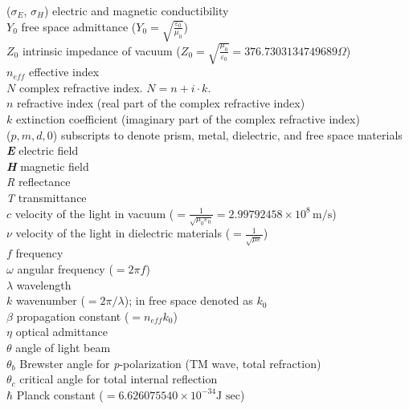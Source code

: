 \begin{tabbing}
  ($\sigma_{E}$, $\sigma_{H}$) \> electric and magnetic conductibility \\
  $Y_0$ \> free space admittance ($Y_0=\sqrt{\frac{\displaystyle \varepsilon_0}{\displaystyle \mu_0}}$) \\
  $Z_0$ \> intrinsic impedance of vacuum ($Z_0=\sqrt{\frac{\displaystyle \mu_0}{\displaystyle \varepsilon_0}}
           =376.7303134749689\Omega$) \\
  $n_{eff}$ \> effective index \\
  $N$ \> complex refractive index. $N = n + i \cdot k$. \\
  $n$ \> refractive index (real part of the complex refractive index) \\
  $k$ \> extinction coefficient (imaginary part of the complex refractive index)\\
  ($p, m, d, 0$) \> subscripts to denote prism, metal, dielectric, and free space materials \\
  \emph{\textbf{E}} \> electric field \\
  \emph{\textbf{H}} \> magnetic field \\
  \emph{R} \> reflectance \\
  \emph{T} \> transmittance \\
  $c$ \> velocity of the light in vacuum ($=\frac{\displaystyle 1}
         {\sqrt{\displaystyle \mu_0\varepsilon_0}}=2.99792458 \times 10^{8} \, \textrm{m/s}$)\\
  $\nu$ \> velocity of the light in dielectric materials
         ($=\frac{\displaystyle 1}{\sqrt{\displaystyle \mu \varepsilon}}$)\\
  $f$ \> frequency \\
  $\omega$ \> angular frequency ($= 2 \pi f$)\\
  $\lambda$ \> wavelength \\
  $k$ \> wavenumber ($=2\pi/\lambda$); in free space denoted as $k_0$\\
  $\beta$ \> propagation constant ($=n_{eff}k_0$) \\
  $\eta$ \> optical admittance \\
  $\theta$ \> angle of light beam \\
  $\theta_b$ \> Brewster angle for \emph{p}-polarization (TM wave, total refraction) \\
  $\theta_c$ \> critical angle for total internal reflection \\
  $\hbar$ \> Planck constant ($=6.626075540 \times 10^{-34} \textrm{J sec}$)
\end{tabbing}
